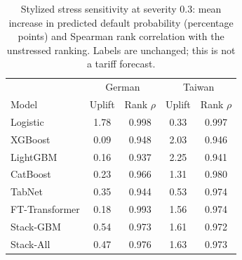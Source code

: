 \begin{table}[t]
\centering
\caption{Stylized stress sensitivity at severity 0.3: mean increase in predicted default probability (percentage points) and Spearman rank correlation with the unstressed ranking. Labels are unchanged; this is not a tariff forecast.}
\label{tab:stress}
\small
\setlength{\tabcolsep}{4pt}
\begin{tabular}{l|cc|cc}
\toprule
 & \multicolumn{2}{c|}{German} & \multicolumn{2}{c}{Taiwan}\\
Model & Uplift & Rank $\rho$ & Uplift & Rank $\rho$\\
\midrule
Logistic & 1.78 & 0.998 & 0.33 & 0.997\\
XGBoost & 0.09 & 0.948 & 2.03 & 0.946\\
LightGBM & 0.16 & 0.937 & 2.25 & 0.941\\
CatBoost & 0.23 & 0.966 & 1.31 & 0.980\\
TabNet & 0.35 & 0.944 & 0.53 & 0.974\\
FT-Transformer & 0.18 & 0.993 & 1.56 & 0.974\\
Stack-GBM & 0.54 & 0.973 & 1.61 & 0.972\\
Stack-All & 0.47 & 0.976 & 1.63 & 0.973\\
\bottomrule
\end{tabular}
\end{table}